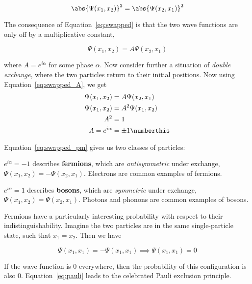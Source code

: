 \begin{equation}
	\abs{\Psi(x_1, x_2)}^2 = \abs{\Psi(x_2, x_1)}^2  \label{eq:swapped}
\end{equation}

The consequence of Equation~\ref{eq:swapped} is that the two wave functions are only off by a multiplicative constant,

\begin{equation}
	\Psi(x_1, x_2) = A \Psi(x_2, x_1)
	\label{eq:swapped_A}
\end{equation}

where $A = e^{i \alpha}$ for some phase $\alpha$.
Now consider further a situation of \emph{double exchange}, where the two particles return to their initial positions. 
Now using Equation~\ref{eq:swapped_A}, we get
\begin{align*}
	\Psi(x_1, x_2) &= A \Psi(x_2, x_1) \\
	\Psi(x_1, x_2) &= A^2  \Psi(x_1, x_2) \\
	A^2 &= 1 \\
	A = e^{i \alpha} &= \pm 1   \numberthis \label{eq:swapped_pm}
\end{align*}

Equation~\ref{eq:swapped_pm} gives us two classes of particles:

\begin{tcolorbox}[title = Fermions]
	$e^{i \alpha} = -1$ describes \textbf{fermions}, which are \emph{antisymmetric} under exchange, $\Psi(x_1, x_2) = - \Psi(x_2, x_1)$.
	Electrons are common examples of fermions.
\end{tcolorbox}

\begin{tcolorbox}[title = Bosons]
	$e^{i \alpha} = 1$ describes \textbf{bosons}, which are \emph{symmetric} under exchange, $\Psi(x_1, x_2) = \Psi(x_2, x_1)$.
	Photons and phonons are common examples of bosons.
\end{tcolorbox}

Fermions have a particularly interesting probability with respect to their indistinguishability.
Imagine the two particles are in the same single-particle state, such that $x_1 = x_2$.
Then we have 

\begin{equation}
	\Psi(x_1, x_1) = -\Psi(x_1, x_1) \implies \Psi(x_1, x_1) = 0   \label{eq:pauli}
\end{equation}

If the wave function is 0 everywhere, then the probability of this configuration is also 0.
Equation~\ref{eq:pauli} leads to the celebrated Pauli exclusion principle.

